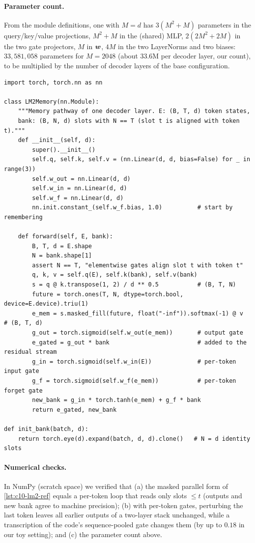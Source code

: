 \paragraph{Parameter count.} From the module definitions, one  with $M = d$
has $3(M^2+M)$ parameters in the query/key/value projections, $M^2 + M$ in the (shared) MLP,
$2(2M^2 + 2M)$ in the two gate projectors, $M$ in $\bm{w}$, $4M$ in the two LayerNorms and two
biases: $33{,}581{,}058$ parameters for $M = 2048$ (about 33.6M per decoder layer, our count), to
be multiplied by the number of decoder layers of the base configuration.

\begin{lstlisting}[caption={Reference implementation (ours): LM2 memory read, gated output and gated write with per-token gates.},label={lst:c10-lm2-ref}]
import torch, torch.nn as nn

class LM2Memory(nn.Module):
    """Memory pathway of one decoder layer. E: (B, T, d) token states,
    bank: (B, N, d) slots with N == T (slot t is aligned with token t)."""
    def __init__(self, d):
        super().__init__()
        self.q, self.k, self.v = (nn.Linear(d, d, bias=False) for _ in range(3))
        self.w_out = nn.Linear(d, d)
        self.w_in = nn.Linear(d, d)
        self.w_f = nn.Linear(d, d)
        nn.init.constant_(self.w_f.bias, 1.0)          # start by remembering

    def forward(self, E, bank):
        B, T, d = E.shape
        N = bank.shape[1]
        assert N == T, "elementwise gates align slot t with token t"
        q, k, v = self.q(E), self.k(bank), self.v(bank)
        s = q @ k.transpose(1, 2) / d ** 0.5           # (B, T, N)
        future = torch.ones(T, N, dtype=torch.bool, device=E.device).triu(1)
        e_mem = s.masked_fill(future, float("-inf")).softmax(-1) @ v   # (B, T, d)
        g_out = torch.sigmoid(self.w_out(e_mem))       # output gate
        e_gated = g_out * bank                         # added to the residual stream
        g_in = torch.sigmoid(self.w_in(E))             # per-token input gate
        g_f = torch.sigmoid(self.w_f(e_mem))           # per-token forget gate
        new_bank = g_in * torch.tanh(e_mem) + g_f * bank
        return e_gated, new_bank

def init_bank(batch, d):
    return torch.eye(d).expand(batch, d, d).clone()   # N = d identity slots
\end{lstlisting}

\paragraph{Numerical checks.} In NumPy (scratch space) we verified that (a) the masked parallel
form of \cref{lst:c10-lm2-ref} equals a per-token loop that reads only slots $\le t$ (outputs and
new bank agree to machine precision); (b) with per-token gates, perturbing the last token leaves
all earlier outputs of a two-layer stack unchanged, while a transcription of the code's
sequence-pooled gate changes them (by up to $0.18$ in our toy setting); and (c) the parameter
count above.


